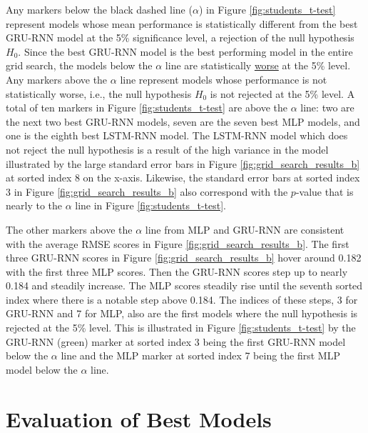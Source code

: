 Any markers below the black dashed line ($\alpha$) in Figure \ref{fig:students_t-test} represent models whose mean performance is statistically different from the best \ac{GRU-RNN} model at the 5\% significance level, a rejection of the null hypothesis $H_{0}$. Since the best \ac{GRU-RNN} model is the best performing model in the entire grid search, the models below the $\alpha$ line are statistically \underline{worse} at the 5\% level. Any markers above the $\alpha$ line represent models whose performance is not statistically worse, i.e., the null hypothesis $H_{0}$ is not rejected at the 5\% level. A total of ten markers in Figure \ref{fig:students_t-test} are above the $\alpha$ line: two are the next two best \ac{GRU-RNN} models, seven are the seven best \ac{MLP} models, and one is the eighth best \ac{LSTM-RNN} model. The \ac{LSTM-RNN} model which does not reject the null hypothesis is a result of the high variance in the model illustrated by the large standard error bars in Figure \ref{fig:grid_search_results_b} at sorted index 8 on the x-axis. Likewise, the standard error bars at sorted index 3 in Figure \ref{fig:grid_search_results_b} also correspond with the $p$-value that is nearly to the $\alpha$ line in Figure \ref{fig:students_t-test}.

The other markers above the $\alpha$ line from \ac{MLP} and \ac{GRU-RNN} are consistent with the average RMSE scores in Figure \ref{fig:grid_search_results_b}. The first three \ac{GRU-RNN} scores in Figure \ref{fig:grid_search_results_b} hover around 0.182 with the first three \ac{MLP} scores. Then the \ac{GRU-RNN} scores step up to nearly 0.184 and steadily increase. The \ac{MLP} scores steadily rise until the seventh sorted index where there is a notable step above 0.184. The indices of these steps, 3 for \ac{GRU-RNN} and 7 for \ac{MLP}, also are the first models where the null hypothesis is rejected at the 5\% level. This is illustrated in Figure \ref{fig:students_t-test} by the \ac{GRU-RNN} (green) marker at sorted index 3 being the first \ac{GRU-RNN} model below the $\alpha$ line and the \ac{MLP} marker at sorted index 7 being the first \ac{MLP} model below the $\alpha$ line.

\section{Evaluation of Best Models}

